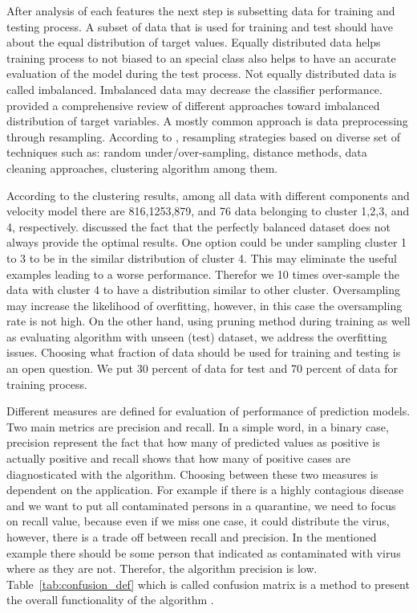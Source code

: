 After analysis of each features the next step is subsetting data for training and testing process. A subset of data that is used for training and test should have about the equal distribution of target values. Equally distributed data helps training process to not biased to an special class also helps to have an accurate evaluation of the model during the test process. Not equally distributed data is called imbalanced. Imbalanced data may decrease the classifier performance. \citet{Branco_2015} provided a comprehensive review of different approaches toward imbalanced distribution of target variables. A mostly common approach is data preprocessing through resampling. According to \citet{Branco_2015}, resampling strategies based on diverse set of techniques such as: random under/over-sampling, distance methods, data cleaning approaches, clustering algorithm among them.

According to the clustering results, among all data with different components and velocity model there are 816,1253,879, and 76 data belonging to cluster 1,2,3, and 4, respectively. \citet{Weiss_2003} discussed the fact that the perfectly balanced dataset does not always provide the optimal results. One option could be under sampling cluster 1 to 3 to be in the similar distribution of cluster 4. This may eliminate the useful examples leading to a worse performance. Therefor we 10 times over-sample the data with cluster 4 to have a distribution similar to other cluster. Oversampling may increase the likelihood of overfitting, however, in this case the oversampling rate is not high. On the other hand, using pruning method during training as well as evaluating algorithm with unseen (test) dataset, we address the overfitting issues.  Choosing what fraction of data should be used for training and testing is an open question. We put 30 percent of data for test and 70 percent of data for training process. 

Different measures are defined for evaluation of performance of prediction models. Two main metrics are precision and recall. In a simple word, in a binary case, precision represent the fact that how many of predicted values as positive is actually positive and recall shows that how many of positive cases are diagnosticated with the algorithm. Choosing between these two measures is dependent on the application. For example if there is a highly contagious disease and we want to put all contaminated persons in a quarantine, we need to focus on recall value, because even if we miss one case, it could distribute the virus, however, there is a trade off between recall and precision. In the mentioned example there should be some person that indicated as contaminated with virus where as they are not. Therefor, the algorithm precision is low. Table~\ref{tab:confusion_def} which is called confusion matrix is a method to present the overall functionality of the algorithm \citep{Branco_2015}.  


